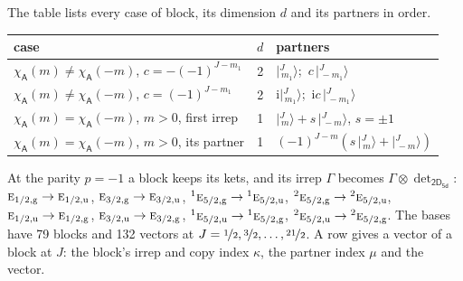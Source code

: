 \documentclass[10pt,a4paper]{article}
\numberwithin{equation}{section}
\newcommand{\grp}[1]{\mathsf{#1}}
\newcommand{\irr}[1]{\text{\normalfont\scshape #1}}
\newcommand{\conjpair}[1]{{}^{#1}}
\newcommand{\ptag}[1]{\mathrm{#1}}
\newcommand{\iunit}{\mathrm{i}}
\newcommand{\chiA}{\chi_{\grp{A}}}
\newcommand{\irrprod}{\otimes}
\newcommand{\mult}{\kappa}
\newcommand{\intx}{\mu}
\newcommand{\jm}[2]{\bigl\lvert{}^{#1}_{\,#2}\bigr\rangle}
\begin{document}
\leavevmode\label{n:head.case}\label{n:head.partners}The table lists every case of block, its dimension $d$ and its partners in order.
\begin{center}\begin{tabular}{@{}lrl@{}}\toprule
case & $d$ & partners\\\midrule
$\chiA(m) \ne \chiA(-m)$, $c = -(-1)^{J-m_1}$ & 2 & $\jm{J}{m_1}$;\ $c\,\jm{J}{-m_1}$\\
$\chiA(m) \ne \chiA(-m)$, $c = (-1)^{J-m_1}$ & 2 & $\iunit\jm{J}{m_1}$;\ $\iunit c\,\jm{J}{-m_1}$\\
$\chiA(m) = \chiA(-m)$, $m > 0$, first irrep & 1 & $\jm{J}{m} + s\,\jm{J}{-m}$, $s = \pm1$\\
$\chiA(m) = \chiA(-m)$, $m > 0$, its partner & 1 & $(-1)^{J-m}(s\,\jm{J}{m} + \jm{J}{-m})$\\
\bottomrule\end{tabular}\end{center}
At the parity $p = -1$ a block keeps its kets, and its irrep $\Gamma$ becomes $\Gamma \irrprod \det_{\grp{2D_{5d}}}$: $\irr{e}_{1/2,\ptag{g}} \to \irr{e}_{1/2,\ptag{u}}$, $\irr{e}_{3/2,\ptag{g}} \to \irr{e}_{3/2,\ptag{u}}$, $\conjpair{1}\irr{e}_{5/2,\ptag{g}} \to \conjpair{1}\irr{e}_{5/2,\ptag{u}}$, $\conjpair{2}\irr{e}_{5/2,\ptag{g}} \to \conjpair{2}\irr{e}_{5/2,\ptag{u}}$, $\irr{e}_{1/2,\ptag{u}} \to \irr{e}_{1/2,\ptag{g}}$, $\irr{e}_{3/2,\ptag{u}} \to \irr{e}_{3/2,\ptag{g}}$, $\conjpair{1}\irr{e}_{5/2,\ptag{u}} \to \conjpair{1}\irr{e}_{5/2,\ptag{g}}$, $\conjpair{2}\irr{e}_{5/2,\ptag{u}} \to \conjpair{2}\irr{e}_{5/2,\ptag{g}}$.
The bases have 79 blocks and 132 vectors at $J = \nicefrac{1}{2}, \nicefrac{3}{2}, \dots, \nicefrac{21}{2}$. \label{n:head.vector}A row gives a vector of a block at $J$: the block's irrep and copy index $\mult$, the partner index $\intx$ and the vector.
\end{document}
